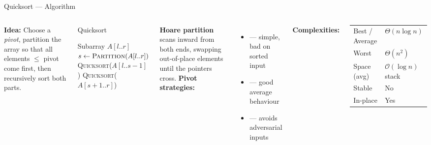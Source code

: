 \documentclass[aspectratio=169]{beamer}
\begin{document}
\begin{frame}[shrink=12]{Quicksort — Algorithm}
  \begin{columns}[T]
      \textbf{Idea:} Choose a \emph{pivot}, partition the array so that
      all elements $\leq$ pivot come first, then recursively sort
      both parts.
      \vspace{0.3em}
      \begin{block}{Quicksort}
        \begin{algorithmic}[1]
          \Require Subarray $A[l..r]$
            \State $s \gets \textsc{Partition}(A[l..r])$
            \State \textsc{Quicksort}($A[l..s{-}1]$)
            \State \textsc{Quicksort}($A[s{+}1..r]$)
          \EndIf
        \end{algorithmic}
      \end{block}
      \vspace{0.2em}
      \textbf{Hoare partition} scans inward from both ends,
      swapping out-of-place elements until the pointers cross.
      \textbf{Pivot strategies:}
      \begin{itemize}
        \item {} — simple, \alert{bad on sorted input}
        \item {} — good average behaviour
        \item {} — avoids adversarial inputs
      \end{itemize}
      \vspace{0.4em}
      \textbf{Complexities:}
      \begin{tabular}{ll}
        \toprule
        Best / Average & $\Theta(n\log n)$ \\
        Worst          & $\Theta(n^2)$ \\
        Space (avg)    & $\mathcal{O}(\log n)$ stack \\
        Stable         & No \\
        In-place       & Yes \\
        \bottomrule
      \end{tabular}
  \end{columns}
\end{frame}
\end{document}

